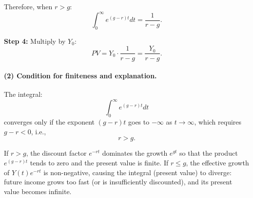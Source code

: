 \documentclass[12pt]{article}
\begin{document}
Therefore, when $r>g$:
\[
\int_0^\infty e^{(g-r)t} dt = \frac{1}{r-g}.
\]

\textbf{Step 4:} Multiply by $Y_0$:
\[
PV = Y_0 \cdot \frac{1}{r-g} = \boxed{\frac{Y_0}{r-g}}.
\]

\paragraph{(2) Condition for finiteness and explanation.}

The integral:
\[
\int_0^\infty e^{(g-r)t} dt
\]
converges only if the exponent $(g-r)t$ goes to $-\infty$ as $t\to\infty$, which requires $g-r<0$, i.e.,
\[
\boxed{r > g.}
\]

If $r>g$, the discount factor $e^{-rt}$ dominates the growth $e^{gt}$ so that the product $e^{(g-r)t}$ tends to zero and the present value is finite. If $r\le g$, the effective growth of $Y(t)e^{-rt}$ is non-negative, causing the integral (present value) to diverge: future income grows too fast (or is insufficiently discounted), and its present value becomes infinite.
\end{document}
